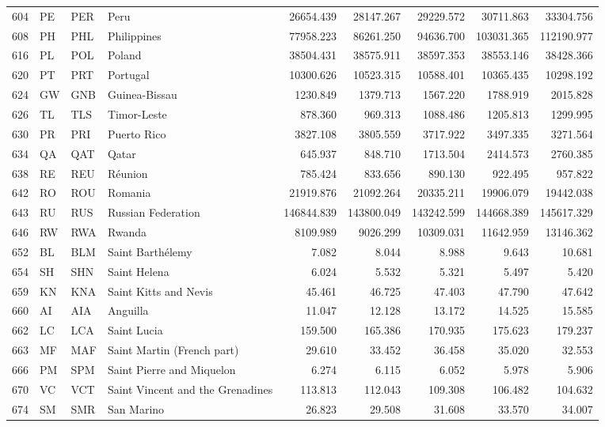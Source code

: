 {\begin{longtable}{rlllrrrrr}
 604 & PE & PER & Peru & 26654.439 & 28147.267 & 29229.572 & 30711.863 & 33304.756 \\
 608 & PH & PHL & Philippines & 77958.223 & 86261.250 & 94636.700 & 103031.365 & 112190.977 \\
 616 & PL & POL & Poland & 38504.431 & 38575.911 & 38597.353 & 38553.146 & 38428.366 \\
 620 & PT & PRT & Portugal & 10300.626 & 10523.315 & 10588.401 & 10365.435 & 10298.192 \\
 624 & GW & GNB & Guinea-Bissau & 1230.849 & 1379.713 & 1567.220 & 1788.919 & 2015.828 \\
 626 & TL & TLS & Timor-Leste & 878.360 & 969.313 & 1088.486 & 1205.813 & 1299.995 \\
 630 & PR & PRI & Puerto Rico & 3827.108 & 3805.559 & 3717.922 & 3497.335 & 3271.564 \\
 634 & QA & QAT & Qatar & 645.937 & 848.710 & 1713.504 & 2414.573 & 2760.385 \\
 638 & RE & REU & Réunion & 785.424 & 833.656 & 890.130 & 922.495 & 957.822 \\
 642 & RO & ROU & Romania & 21919.876 & 21092.264 & 20335.211 & 19906.079 & 19442.038 \\
 643 & RU & RUS & Russian Federation & 146844.839 & 143800.049 & 143242.599 & 144668.389 & 145617.329 \\
 646 & RW & RWA & Rwanda & 8109.989 & 9026.299 & 10309.031 & 11642.959 & 13146.362 \\
 652 & BL & BLM & Saint Barthélemy & 7.082 & 8.044 & 8.988 & 9.643 & 10.681 \\
 654 & SH & SHN & Saint Helena & 6.024 & 5.532 & 5.321 & 5.497 & 5.420 \\
 659 & KN & KNA & Saint Kitts and Nevis & 45.461 & 46.725 & 47.403 & 47.790 & 47.642 \\
 660 & AI & AIA & Anguilla & 11.047 & 12.128 & 13.172 & 14.525 & 15.585 \\
 662 & LC & LCA & Saint Lucia & 159.500 & 165.386 & 170.935 & 175.623 & 179.237 \\
 663 & MF & MAF & Saint Martin (French part) & 29.610 & 33.452 & 36.458 & 35.020 & 32.553 \\
 666 & PM & SPM & Saint Pierre and Miquelon & 6.274 & 6.115 & 6.052 & 5.978 & 5.906 \\
 670 & VC & VCT & Saint Vincent and the Grenadines & 113.813 & 112.043 & 109.308 & 106.482 & 104.632 \\
 674 & SM & SMR & San Marino & 26.823 & 29.508 & 31.608 & 33.570 & 34.007 \\

\end{longtable}}
